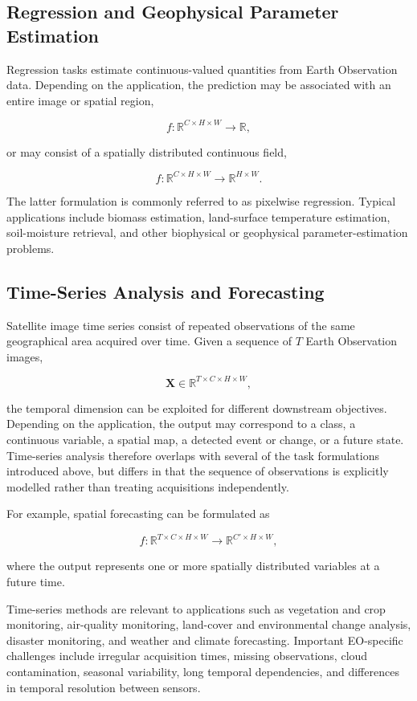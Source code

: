 \documentclass[11pt,a4paper]{article}
\begin{document}
\subsection{Regression and Geophysical Parameter Estimation}
Regression tasks estimate continuous-valued quantities from Earth
Observation data. Depending on the application, the prediction may be
associated with an entire image or spatial region,

\[
f:\mathbb{R}^{C\times H\times W}\rightarrow\mathbb{R},
\]

or may consist of a spatially distributed continuous field,

\[
f:\mathbb{R}^{C\times H\times W}
\rightarrow
\mathbb{R}^{H\times W}.
\]

The latter formulation is commonly referred to as pixelwise regression.
Typical applications include biomass estimation, land-surface
temperature estimation, soil-moisture retrieval, and other biophysical
or geophysical parameter-estimation problems.

\subsection{Time-Series Analysis and Forecasting}

Satellite image time series consist of repeated observations of the same
geographical area acquired over time. Given a sequence of \(T\) Earth
Observation images,

\[
\mathbf{X}
\in
\mathbb{R}^{T\times C\times H\times W},
\]

the temporal dimension can be exploited for different downstream
objectives. Depending on the application, the output may correspond to a
class, a continuous variable, a spatial map, a detected event or change,
or a future state. Time-series analysis therefore overlaps with several
of the task formulations introduced above, but differs in that the
sequence of observations is explicitly modelled rather than treating
acquisitions independently.

For example, spatial forecasting can be formulated as

\[
f:
\mathbb{R}^{T\times C\times H\times W}
\rightarrow
\mathbb{R}^{C'\times H\times W},
\]

where the output represents one or more spatially distributed variables
at a future time.

Time-series methods are relevant to applications such as vegetation and
crop monitoring, air-quality monitoring, land-cover and environmental
change analysis, disaster monitoring, and weather and climate
forecasting. Important EO-specific challenges include irregular
acquisition times, missing observations, cloud contamination, seasonal
variability, long temporal dependencies, and differences in temporal
resolution between sensors.
\end{document}
